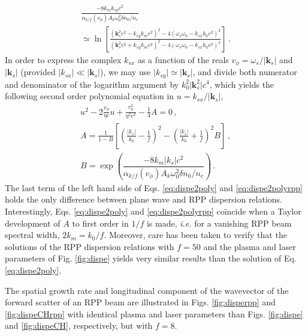 \documentclass[
 reprint,
 amsmath,amssymb,
 aps,
]{revtex4-1}
\begin{document}
\begin{align}
 \frac{-8k_mk_{sy}c^2}{\alpha_{k/f}(v_\phi)A_k \omega_0^2\delta n_0/n_c  } \nonumber\\
 \simeq  \ln\left[
 \frac{ (\mathbf{k}_s^2c^2-k_{sy} k_m c^2)^2 -4(\omega_s\omega_0 - k_{sx}k_0 c^2)^2}{ (\mathbf{k}_s^2c^2+k_{sy} k_m c^2)^2 -4(\omega_s\omega_0 - k_{sx}k_0 c^2)^2} \right] \, .\label{eq:disperpp2} 
\end{align}
In order to express the complex $k_{sx}$ as a function of the reals $v_\phi=\omega_s/\vert \mathbf{k}_s\vert $ and $\vert \mathbf{k}_s\vert $ (provided  $\vert k_{sx}\vert \ll \vert \mathbf{k}_s\vert$), we may use $\vert k_{sy} \vert  \simeq \vert \mathbf{k}_s\vert$, and divide both numerator and denominator of the logarithm argument by $k_0^2\vert \mathbf{k}_s^2\vert c^4$, which yields the following second order polynomial equation in $u =  k_{sx}/\vert \mathbf{k}_s\vert$,
\begin{align}
u^2 -2\frac{v_\phi}{\eta c}u +\frac{v_\phi^2}{\eta^2 c^2}-\frac{1}{4}A =0 
\, , \nonumber\\
A= \frac{1}{1-B}\left[ \left(\frac{\vert k_{s}\vert}{k_0}-\frac{1}{f}\right)^2-\left(\frac{\vert k_{s}\vert}{k_0}+\frac{1}{f}\right)^2B  \right]\, , \nonumber \\ 
B =\exp\left(\dfrac{-8k_m \vert k_{s}\vert c^2}{\alpha_{k/f}(v_\phi)A_k \omega_0^2\delta n_0/n_c  }\right)\, . \label{eq:dispe2polyrpp} 
\end{align}
The last term of the left hand side of  Eqs. \eqref{eq:dispe2poly} and \eqref{eq:dispe2polyrpp} holds the only difference between plane wave and RPP dispersion relations. 
Interestingly,  Eqs.   \eqref{eq:dispe2poly} and     \eqref{eq:dispe2polyrpp} co\"incide when  a Taylor development of $A$ to first order  in $1/f$ is made, \emph{i.e.} for a vanishing  RPP beam spectral width, $2k_m=k_0/f$.
Moreover, care has been taken to verify that the solutions of the RPP dispersion relations with  $f = 50$ and the plasma and laser parameters of Fig. \ref{fig:dispe} yields  very similar results than the solution of Eq. \eqref{eq:dispe2poly}.

The spatial growth rate and longitudinal component of the wavevector of the forward scatter of an RPP beam are illustrated in  
Figs. \ref{fig:disperpp} and \ref{fig:dispeCHrpp} with identical plasma and laser parameters than Figs.  \ref{fig:dispe} and \ref{fig:dispeCH}, respectively, but with $f=8$.
\end{document}
